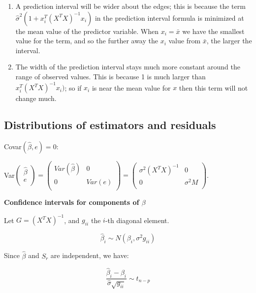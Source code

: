 \begin{enumerate}
\item
A prediction interval will be wider about the edges; this is because the term $\hat{\sigma}^2 (1+x_i^T(X^T X)^{-1}x_i)$ in the prediction interval formula is minimized at the mean value of the 
predictor variable. When $x_i = \bar{x}$ we have the smallest value for the term, and so the further away the $x_i$ value from $\bar{x}$, the larger the interval. 
\item 
The width of the prediction interval stays much more constant around the range of observed values.
This is because 1 is much larger than $x_i^T(X^T X)^{-1}x_i)$; so if $x_i$ is near the mean value for $x$ then this term will not change much. 

\end{enumerate}

\subsection{Distributions of estimators and residuals}

Covar$(\hat{\beta},e)=0$: 

         Var$\begin{pmatrix}
	 \hat{\beta} \\
	e \\
	\end{pmatrix}
	= 
	\begin{pmatrix}
	 Var(\hat{\beta}) & 0 \\
	 0 & Var(e) \\
	\end{pmatrix}
	= 
	\begin{pmatrix}
	 \sigma^2 (X^T X)^{-1} & 0 \\
	 0 & \sigma^2 M \\
	\end{pmatrix}
	$.
	
\textbf{Confidence intervals for components of $\beta$}	


Let $G=(X^T X)^{-1}$, and $g_{ii}$ the $i$-th diagonal element. 

\begin{equation}
\hat{\beta}_i \sim N(\beta_i, \sigma^2 g_{ii})
\end{equation}

Since $\hat{\beta}$ and $S_r$ are independent, we have:

\begin{equation}
\frac{\hat{\beta}_i - \beta_i}{\hat{\sigma}\sqrt{g_{ii}}} \sim t_{n-p}
\end{equation}

